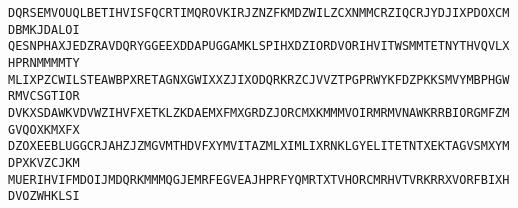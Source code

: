 \begin{example}
\scriptsize
\texttt{\colorbox{orange!30}{D}QRSE\colorbox{orange!30}{M}VOUQ\colorbox{orange!30}{L}BETI\colorbox{orange!30}{H}VISF\colorbox{orange!30}{Q}CRTI\colorbox{orange!30}{M}QROV\colorbox{orange!30}{K}IRJZ\colorbox{orange!30}{N}ZFKM\colorbox{orange!30}{D}ZWIL\colorbox{orange!30}{Z}CXNM\colorbox{orange!30}{M}CRZI\colorbox{orange!30}{Q}CRJY\colorbox{orange!30}{D}JIXP\colorbox{orange!30}{D}OXCM\colorbox{orange!30}{D}BMKJ\colorbox{orange!30}{D}ALOI\\
\colorbox{orange!30}{Q}ESNP\colorbox{orange!30}{H}AXJE\colorbox{orange!30}{D}ZRAV\colorbox{orange!30}{D}QRYG\colorbox{orange!30}{G}EEXD\colorbox{orange!30}{D}APUG\colorbox{orange!30}{G}AMKL\colorbox{orange!30}{S}PIHX\colorbox{orange!30}{D}ZIOR\colorbox{orange!30}{D}VORI\colorbox{orange!30}{H}VITW\colorbox{orange!30}{S}MMTE\colorbox{orange!30}{T}NYTH\colorbox{orange!30}{V}QVLX\colorbox{orange!30}{H}PRNM\colorbox{orange!30}{M}MMTY\\
\colorbox{orange!30}{M}LIXP\colorbox{orange!30}{Z}CWIL\colorbox{orange!30}{S}TEAW\colorbox{orange!30}{B}PXRE\colorbox{orange!30}{T}AGNX\colorbox{orange!30}{G}WIXX\colorbox{orange!30}{Z}JIXO\colorbox{orange!30}{D}QRKR\colorbox{orange!30}{Z}CJVV\colorbox{orange!30}{Z}TPGP\colorbox{orange!30}{R}WYKF\colorbox{orange!30}{D}ZPKK\colorbox{orange!30}{S}MVYM\colorbox{orange!30}{B}PHGW\colorbox{orange!30}{R}MVCS\colorbox{orange!30}{G}TIOR\\
\colorbox{orange!30}{D}VKXS\colorbox{orange!30}{D}AWKV\colorbox{orange!30}{D}VWZI\colorbox{orange!30}{H}VFXE\colorbox{orange!30}{T}KLZK\colorbox{orange!30}{D}AEMX\colorbox{orange!30}{F}MXGR\colorbox{orange!30}{D}ZJOR\colorbox{orange!30}{C}MXKM\colorbox{orange!30}{M}MVOI\colorbox{orange!30}{R}MRMV\colorbox{orange!30}{N}AWKR\colorbox{orange!30}{R}BIOR\colorbox{orange!30}{G}MFZM\colorbox{orange!30}{G}VQOX\colorbox{orange!30}{K}MXFX\\
\colorbox{orange!30}{D}ZOXE\colorbox{orange!30}{E}BLUG\colorbox{orange!30}{G}CRJA\colorbox{orange!30}{H}ZJZM\colorbox{orange!30}{G}VMTH\colorbox{orange!30}{D}VFXY\colorbox{orange!30}{M}VITA\colorbox{orange!30}{Z}MLXI\colorbox{orange!30}{M}LIXR\colorbox{orange!30}{N}KLGY\colorbox{orange!30}{E}LITE\colorbox{orange!30}{T}NTXE\colorbox{orange!30}{K}TAGV\colorbox{orange!30}{S}MXYM\colorbox{orange!30}{D}PXKV\colorbox{orange!30}{Z}CJKM\\
\colorbox{orange!30}{M}UERI\colorbox{orange!30}{H}VIFM\colorbox{orange!30}{D}OIJM\colorbox{orange!30}{D}QRKM\colorbox{orange!30}{M}MQGJ\colorbox{orange!30}{E}MRFE\colorbox{orange!30}{G}VEAJ\colorbox{orange!30}{H}PRFY\colorbox{orange!30}{Q}MRTX\colorbox{orange!30}{T}VHOR\colorbox{orange!30}{C}MRHV\colorbox{orange!30}{T}VRKR\colorbox{orange!30}{R}XVOR\colorbox{orange!30}{F}BIXH\colorbox{orange!30}{D}VOZW\colorbox{orange!30}{H}KLSI\\
}
\end{example}
